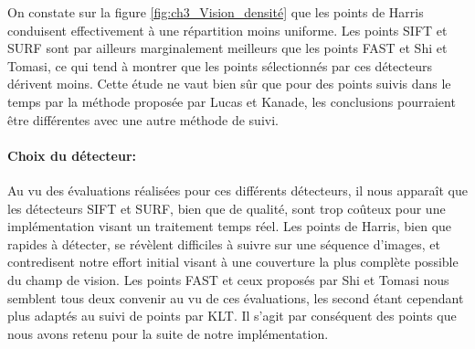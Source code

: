 On constate sur la figure \ref{fig:ch3_Vision_densité} que les points de Harris conduisent effectivement à une répartition moins uniforme. Les points SIFT et SURF sont par ailleurs marginalement meilleurs que les points FAST et Shi et Tomasi, ce qui tend à montrer que les points sélectionnés par ces détecteurs dérivent moins. Cette étude ne vaut bien sûr que pour des points suivis dans le temps par la méthode proposée par Lucas et Kanade, les conclusions pourraient être différentes avec une autre méthode de suivi. \\

\paragraph{Choix du détecteur:\\}
Au vu des évaluations réalisées pour ces différents détecteurs, il nous apparaît que les détecteurs SIFT et SURF, bien que de qualité, sont trop coûteux pour une implémentation visant un traitement temps réel. Les points de Harris, bien que rapides à détecter, se révèlent difficiles à suivre sur une séquence d'images, et contredisent notre effort initial visant à une couverture la plus complète possible du champ de vision. Les points FAST et ceux proposés par Shi et Tomasi nous semblent tous deux convenir au vu de ces évaluations, les second étant cependant plus adaptés au suivi de points par KLT. Il s'agit par conséquent des points que nous avons retenu pour la suite de notre implémentation.

